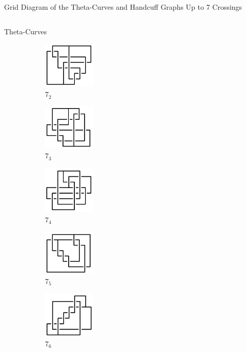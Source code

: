 \documentclass[final]{beamer}
\begin{document}
\begin{frame}[t]
\begin{alertblock}{Grid Diagram of the Theta-Curves and Handcuff Graphs Up to 7 Crossings}
\begin{columns}[t]
\begin{column}{0.7\textwidth}
\begin{alertblock}{Theta-Curves}
\begin{figure}
    \begin{subfigure}{0.075\textwidth}
    \includegraphics[width=2.5cm]{../Midterm_Poster/grid_diagram/theta_7_2.png}
    \caption{$7_{2}$} 
    \end{subfigure}
    \begin{subfigure}{0.075\textwidth}
    \includegraphics[width=2.5cm]{../Midterm_Poster/grid_diagram/theta_7_3.png}
    \caption{$7_{3}$} 
    \end{subfigure}
    \begin{subfigure}{0.075\textwidth}
    \includegraphics[width=2.5cm]{../Midterm_Poster/grid_diagram/theta_7_4.png}
    \caption{$7_{4}$} 
    \end{subfigure}
    \begin{subfigure}{0.075\textwidth}
    \includegraphics[width=2.5cm]{../Midterm_Poster/grid_diagram/theta_7_5.png}
    \caption{$7_{5}$} 
    \end{subfigure}
    \begin{subfigure}{0.075\textwidth}
    \includegraphics[width=2.5cm]{../Midterm_Poster/grid_diagram/theta_7_6.png}
    \caption{$7_{6}$} 
    \end{subfigure}
    \begin{subfigure}{0.075\textwidth}

\end{subfigure}
\end{figure}
\end{alertblock}
\end{column}
\end{columns}
\end{alertblock}
\end{frame}
\end{document}
